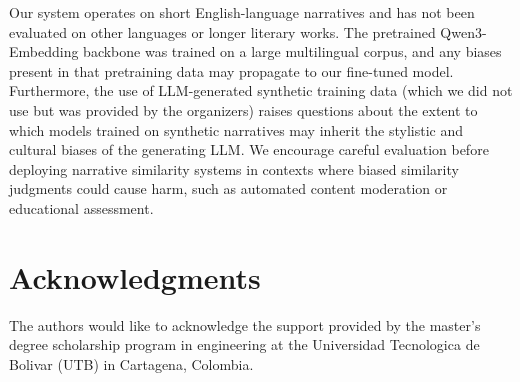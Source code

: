 \documentclass[11pt]{article}
\begin{document}
Our system operates on short English-language narratives and has not been evaluated on other languages or longer literary works. The pretrained Qwen3-Embedding backbone was trained on a large multilingual corpus, and any biases present in that pretraining data may propagate to our fine-tuned model. Furthermore, the use of LLM-generated synthetic training data (which we did not use but was provided by the organizers) raises questions about the extent to which models trained on synthetic narratives may inherit the stylistic and cultural biases of the generating LLM. We encourage careful evaluation before deploying narrative similarity systems in contexts where biased similarity judgments could cause harm, such as automated content moderation or educational assessment.


\section{Acknowledgments}

The authors would like to acknowledge the support provided by the master's degree scholarship program in engineering at the Universidad Tecnologica de Bolivar (UTB) in Cartagena, Colombia.



\appendix


\end{document}
